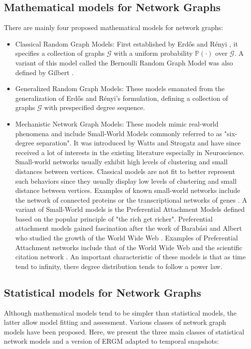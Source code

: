 \subsection{Mathematical models for Network Graphs}
\label{sec:back_mathModel}
There are mainly four proposed mathematical models for network graphs:
\begin{itemize}
\item Classical Random Graph Models: First established by Erd\H os and R\'enyi \cite{erdos_random_1959,erdos_evolution_1960,erdos_strength_1964}, it specifies a collection of graphs $\mathscr{G}$ with a uniform probability $\mathbb{P}(\cdot)$ over $\mathscr{G}$. A variant of this model called the Bernoulli Random Graph Model was also defined by Gilbert \cite{gilbert_random_1959}.
\item Generalized Random Graph Models: These models emanated from the generalization of Erd\H os and R\'enyi's formulation, defining a collection of graphs $\mathscr{G}$ with prespecified degree sequence.
\item Mechanistic Network Graph Models: These models mimic real-world phenomena and include Small-World Models commonly referred to as "six-degree separation". It was introduced by Watts and Strogatz \cite{watts_collective_1998} and have since received a lot of interests in the existing literature especially in Neuroscience. Small-world networks usually exhibit high levels of clustering and small distances between vertices. Classical models are not fit to better represent such behaviors since they usually display low levels of clustering and small distance between vertices. Examples of known small-world networks include the network of connected proteins  or the transcriptional networks of genes \cite{van_noort_yeast_2004}. A variant of Small-World models is the Preferential Attachment Models defined based on the popular principle of "the rich get richer". Preferential attachment models gained fascination after the work of Barab\'asi and Albert who studied the growth of the World Wide Web \cite{barabasi_emergence_1999}. Examples of Preferential Attachment networks include that of the World Wide Web and the scientific citation network \cite{albert_internet:_1999,jeong_measuring_2003}. An important characteristic of these models is that as time tend to infinity, there degree distribution tends to follow a power law.
\end{itemize}

\subsection{Statistical models for Network Graphs}
\label{sec:back_statModel}
Although mathematical models tend to be simpler than statistical models, the latter allow model fitting and assessment. Various classes of network graph models have been proposed. Here, we present the three main classes of statistical network models and a version of ERGM adapted to temporal snapshots:

